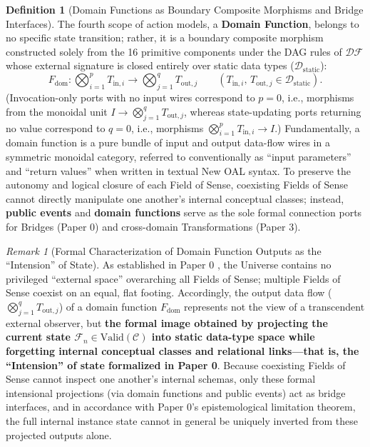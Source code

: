 \documentclass[11pt,a4paper]{article}
\theoremstyle{definition}
\newtheorem{definition}{Definition}[section]
\theoremstyle{plain}
\theoremstyle{remark}
\newtheorem{remark}{Remark}[section]
\newcommand{\Valid}{\mathrm{Valid}}
\newcommand{\DF}{\mathcal{DF}}
\newcommand{\Dstatic}{\mathcal{D}_{\mathrm{static}}}
\begin{document}
\begin{definition}[Domain Functions as Boundary Composite Morphisms and Bridge Interfaces]\label{def:domain-function}
The fourth scope of action models, a \textbf{Domain Function}, belongs to no specific state transition; rather, it is a boundary composite morphism constructed solely from the 16 primitive components under the DAG rules of $\DF$ whose external signature is closed entirely over static data types ($\Dstatic$):
\begin{equation}
F_{\mathrm{dom}} : \bigotimes_{i=1}^p T_{\mathrm{in}, i} \longrightarrow \bigotimes_{j=1}^q T_{\mathrm{out}, j} \qquad (T_{\mathrm{in}, i},\, T_{\mathrm{out}, j} \in \Dstatic).
\end{equation}
(Invocation-only ports with no input wires correspond to $p=0$, i.e., morphisms from the monoidal unit $I \to \bigotimes_{j=1}^q T_{\mathrm{out}, j}$, whereas state-updating ports returning no value correspond to $q=0$, i.e., morphisms $\bigotimes_{i=1}^p T_{\mathrm{in}, i} \to I$.) Fundamentally, a domain function is a pure bundle of input and output data-flow wires in a symmetric monoidal category, referred to conventionally as ``input parameters'' and ``return values'' when written in textual New OAL syntax. To preserve the autonomy and logical closure of each Field of Sense, coexisting Fields of Sense cannot directly manipulate one another's internal conceptual classes; instead, \textbf{public events} and \textbf{domain functions} serve as the sole formal connection ports for Bridges (Paper 0) and cross-domain Transformations (Paper 3).
\end{definition}

\begin{remark}[Formal Characterization of Domain Function Outputs as the ``Intension'' of State]\label{rem:dom-intension}
As established in Paper 0 \cite{ota2026paper0}, the Universe contains no privileged ``external space'' overarching all Fields of Sense; multiple Fields of Sense coexist on an equal, flat footing. Accordingly, the output data flow ($\bigotimes_{j=1}^q T_{\mathrm{out}, j}$) of a domain function $F_{\mathrm{dom}}$ represents not the view of a transcendent external observer, but \textbf{the formal image obtained by projecting the current state $\mathcal{F}_n \in \Valid(\mathcal{C})$ into static data-type space while forgetting internal conceptual classes and relational links---that is, the ``Intension'' of state formalized in Paper 0}. Because coexisting Fields of Sense cannot inspect one another's internal schemas, only these formal intensional projections (via domain functions and public events) act as bridge interfaces, and in accordance with Paper 0's epistemological limitation theorem, the full internal instance state cannot in general be uniquely inverted from these projected outputs alone.
\end{remark}
\end{document}
